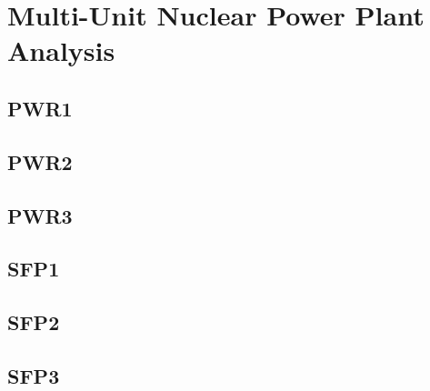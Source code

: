 \section{Multi-Unit Nuclear Power Plant Analysis}

\subsection{PWR1}


\subsection{PWR2}

\subsection{PWR3}

\subsection{SFP1}

\subsection{SFP2}

\subsection{SFP3}